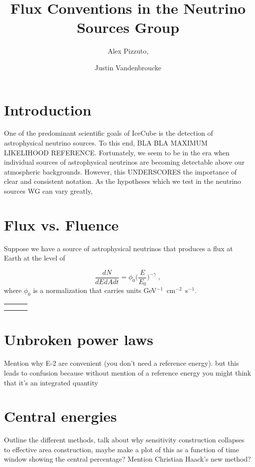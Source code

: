 \documentclass[a4paper,11pt]{article}
\title{\boldmath Flux Conventions in the Neutrino Sources Group}
\author[a]{Alex Pizzuto,}
\author[a]{Justin Vandenbroucke}
\affiliation[a]{Dept. of Physics and Wisconsin IceCube Particle Astrophysics Center, University of Wisconsin, Madison, WI 53706, USA }
\begin{document}
 
\maketitle
\flushbottom

\section{Introduction\label{sec:intro}}
One of the predominant scientific goals of IceCube is the detection of astrophysical neutrino sources. To this end, BLA BLA MAXIMUM LIKELIHOOD REFERENCE. Fortunately, we seem to be in the era when individual sources of astrophysical neutrinos are becoming detectable above our atmospheric backgrounds. However, this UNDERSCORES the importance of clear and consistent notation. As the hypotheses which we test in the neutrino sources WG can vary greatly, 

\section{Flux vs. Fluence}
Suppose we have a source of astrophysical neutrinos that produces a flux at Earth at the level of

\begin{equation}
    \frac{dN}{dEdAdt} = \phi_0 \Big(\frac{E}{E_0}\Big)^{-\gamma}\;,
\end{equation}
where $\phi_0$ is a normalization that carries units GeV$^{-1}$~cm$^{-2}$~s$^{-1}$.

\begin{tabular}{l|c|c}
     &  \\
     & 
\end{tabular}

\section{Unbroken power laws}
Mention why E-2 are convenient (you don't need a reference energy). but this leads to confusion because without mention of a reference energy you might think that it's an integrated quantity

\section{Central energies}
Outline the different methods, talk about why sensitivity construction collapses to effective area construction, maybe make a plot of this as a function of time window showing the central percentage? Mention Christian Haack's new method?
\end{document}
